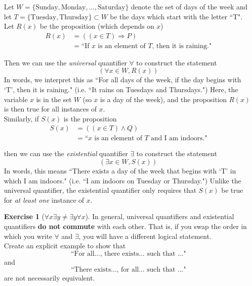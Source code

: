 \documentclass[12pt]{article}
\renewcommand{\_}[1]{\underline{ #1 }}
\theoremstyle{definition}
\newtheorem{exercise}[theorem]{\color{orange}Exercise}
\numberwithin{equation}{subsection}
\begin{document}
Let $W=\{\text{Sunday}, \text{Monday}, \ldots, \text{Saturday}\}$ denote the set of days of the week and let $T=\{\text{Tuesday},\text{Thursday}\}\subset W$ be the days which start with the letter ``T".\\

Let $R(x)$ be the proposition (which depends on $x$)
\begin{align*}
    R(x) &= ((x\in T) \Longrightarrow P)\\
    &= \text{``If $x$ is an element of $T$, then it is raining."}
\end{align*}

Then we can use the \emph{universal} quantifier $\forall$ to construct the statement
$$
    (\forall x\in W, R(x))
$$
In words, we interpret this as ``For all days of the week, if the day begins with `T', then it is raining." (i.e. ``It rains on Tuesdays and Thursdays.") Here, the variable $x$ is in the set $W$ (so $x$ is a day of the week), and the proposition $R(x)$ is then true for all instances of $x$.\\

Similarly, if $S(x)$ is the proposition
\begin{align*}
    S(x) &= ((x\in T) \land Q)\\
    &= \text{``$x$ is an element of $T$ and I am indoors."}
\end{align*}

then we can use the \emph{existential} quantifier $\exists$ to construct the statement
$$
    (\exists x\in W, S(x))
$$
In words, this means ``There exists a day of the week that begins with `T' in which I am indoors." (i.e. ``I am indoors on Tuesday or Thursday.") Unlike the universal quantifier, the existential quantifier only requires that $S(x)$ be true for \emph{at least one} instance of $x$.

\newpage

\begin{exercise}[$\forall x \exists y \neq \exists y \forall x$]
    In general, universal quantifiers and existential quantifiers \textbf{do not commute} with each other. That is, if you swap the order in which you write $\forall$ and $\exists$, you will have a different logical statement.\\

Create an explicit example to show that \[\text{``For all..., there exists... such that ..."}\] and \[\text{``There exists..., for all... such that ..."}\] are not necessarily equivalent.
\end{exercise}
\end{document}
